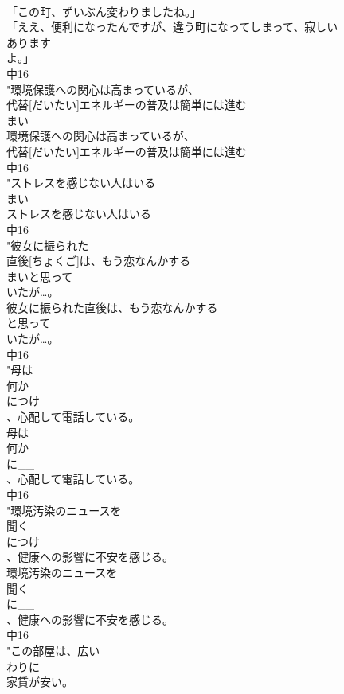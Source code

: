 \documentclass[8pt]{extreport}
\begin{document}
\begin{CJK}{UTF8}{min}
\\	「この町、ずいぶん変わりましたね。」
\\	「ええ、便利になったんですが、違う町になってしまって、寂しい
\\	あります
\\	よ。」
\\	中16
\\	"環境保護への関心は高まっているが、
\\	代替[だいたい]エネルギーの普及は簡単には進む
\\	まい
\\	環境保護への関心は高まっているが、
\\	代替[だいたい]エネルギーの普及は簡単には進む
\\	中16
\\	"ストレスを感じない人はいる
\\	まい
\\	ストレスを感じない人はいる
\\	中16
\\	"彼女に振られた
\\	直後[ちょくご]は、もう恋なんかする
\\	まいと思って
\\	いたが…。
\\	彼女に振られた直後は、もう恋なんかする
\\	と思って
\\	いたが…。
\\	中16
\\	"母は
\\	何か
\\	につけ
\\	、心配して電話している。
\\	母は
\\	何か
\\	に__
\\	、心配して電話している。
\\	中16
\\	"環境汚染のニュースを
\\	聞く
\\	につけ
\\	、健康への影響に不安を感じる。
\\	環境汚染のニュースを
\\	聞く
\\	に__
\\	、健康への影響に不安を感じる。
\\	中16
\\	"この部屋は、広い
\\	わりに
\\	家賃が安い。

\end{CJK}
\end{document}
